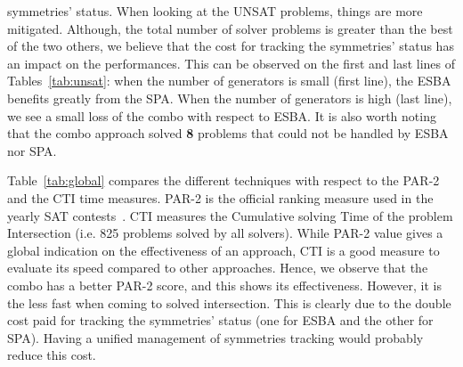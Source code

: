 symmetries’ status. When looking at the UNSAT problems, things are more
mitigated. Although, the total number of solver problems is greater than the
best of the two others, we believe that the cost for tracking the symmetries’
status has an impact on the performances. This can be observed on the first and
last lines of Tables~\ref{tab:unsat}: when the number of generators is small
(first line), the ESBA benefits greatly from the SPA. When the number of
generators is high (last line), we see a small loss of the combo with respect
to ESBA. It is also worth noting that the combo approach solved \textbf{8} problems 
that could not be handled by ESBA nor SPA.
\begin{table}[!htbp]
 \begin{center}
 \end{center}
 \caption{Comparison of PAR-2 and CTI times (in seconds) of the global solving.}
 \label{tab:global}
\end{table}
Table~\ref{tab:global} compares the different techniques with respect to the
PAR-2 and the CTI time measures. PAR-2 is the official ranking measure used in
the yearly SAT contests~\cite{jarvisalo2012international}. CTI measures the
Cumulative solving Time of the problem Intersection (i.e. 825 problems solved
by all solvers). While PAR-2 value gives a global indication on the
effectiveness of an approach, CTI is a good measure to evaluate its speed compared
to other approaches.
Hence, we observe that the combo has a better PAR-2 score, and this shows its
effectiveness. However, it is the less fast when coming to solved intersection.
This is clearly due to the double cost paid for tracking the symmetries’ status
(one for ESBA and the other for SPA). Having a unified management of
symmetries tracking would probably reduce this cost.
